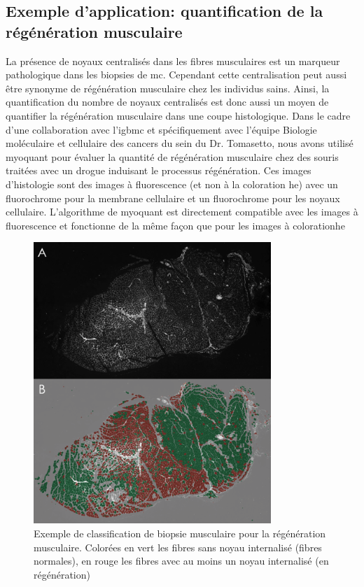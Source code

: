 \subsection{Exemple d'application: quantification de la régénération musculaire }
La présence de noyaux centralisés dans les fibres musculaires est un marqueur pathologique dans les biopsies de \gls{mc}. Cependant cette centralisation peut aussi être synonyme de régénération musculaire chez les individus sains. Ainsi, la quantification du nombre de noyaux centralisés est donc aussi un moyen de quantifier la régénération musculaire dans une coupe histologique. Dans le cadre d'une collaboration avec l'\gls{igbmc} et spécifiquement avec l'équipe Biologie moléculaire et cellulaire des cancers du sein du Dr. Tomasetto, nous avons utilisé \gls{myoquant} pour évaluer la quantité de régénération musculaire chez des souris traitées avec un drogue induisant le processus régénération. Ces images d'histologie sont des images à fluorescence (et non à la coloration \gls{he}) avec un fluorochrome pour la membrane cellulaire et un fluorochrome pour les noyaux cellulaire. L'algorithme de \gls{myoquant} est directement compatible avec les images à fluorescence et fonctionne de la même façon que pour les images à coloration\gls{he}
\begin{figure}[htbp]
 \centering
 \includegraphics[width=0.8\textwidth]{figures/fluo_nuc.png}
 \caption[Exemple de classification de biopsie musculaire pour la régénération musculaire]{Exemple de classification de biopsie musculaire pour la régénération musculaire. Colorées en vert les fibres sans noyau internalisé (fibres normales), en rouge les fibres avec au moins un noyau internalisé (en régénération)}
 \label{fig:fluo_paint}
\end{figure}

